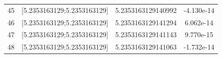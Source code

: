 \documentclass[11pt, oneside]{article}   	%
\begin{document}
\begin{center}
\begin{tabular}{ |c|c|c|c| }
 45 & [5.2353163129;5.2353163129] & 5.2353163129140992 &   -4.130e-14 \\ 
 46 & [5.2353163129;5.2353163129] & 5.2353163129141294 &    6.062e-14 \\ 
 47 & [5.2353163129;5.2353163129] & 5.2353163129141143 &    9.770e-15 \\ 
 48 & [5.2353163129;5.2353163129] & 5.2353163129141063 &   -1.732e-14 \\ 
 \hline
\end{tabular}
\end{center}
\end{document}
